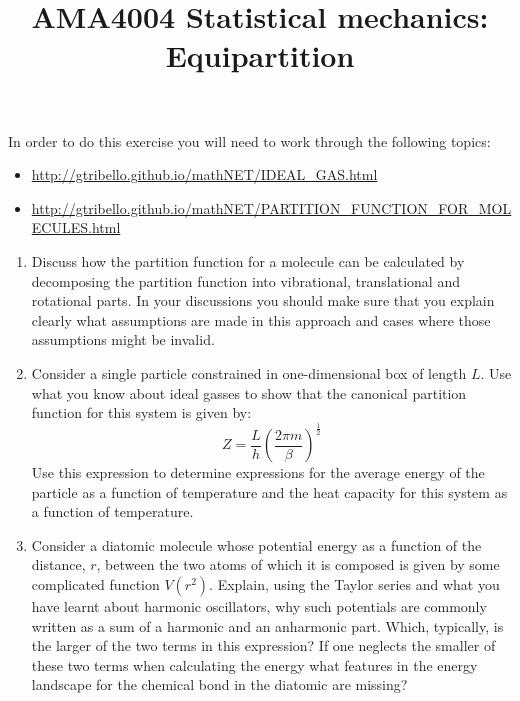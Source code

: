\documentclass[a4paper]{article}
\title{
\vspace{-3em}
\begin{tcolorbox}
\Huge\sffamily AMA4004 Statistical mechanics: Equipartition  
\end{tcolorbox}
\vspace{-3em}
}
\date{}
\begin{document}
\maketitle

In order to do this exercise you will need to work through the following topics:

\begin{itemize}
\item \href{http://gtribello.github.io/mathNET/IDEAL\_GAS.html}{http://gtribello.github.io/mathNET/IDEAL\_GAS.html}
\item \href{http://gtribello.github.io/mathNET/PARTITION\_FUNCTION\_FOR\_MOLECULES.html}{http://gtribello.github.io/mathNET/PARTITION\_FUNCTION\_FOR\_MOLECULES.html}
\end{itemize}

\begin{enumerate}

\item Discuss how the partition function for a molecule can be calculated by decomposing the partition function into vibrational, translational and rotational parts.  In your discussions you should make sure that you explain clearly what assumptions are made in this approach and cases where those assumptions might be invalid.

\item Consider a single particle constrained in one-dimensional box of length $L$.  Use what you know about ideal gasses to show that the canonical partition function for this system is given by:
$$
Z = \frac{L}{h} \left( \frac{2\pi m}{\beta} \right)^\frac{1}{2} 
$$
Use this expression to determine expressions for the average energy of the particle as a function of temperature and the heat capacity for this system as a function of temperature.

\item Consider a diatomic molecule whose potential energy as a function of the distance, $r$, between the two atoms of which it is composed is given by some complicated function $V(r^2)$.  Explain, using the Taylor series and what you have learnt about harmonic oscillators, why such potentials are commonly written as a sum of a harmonic and an anharmonic part.  Which, typically, is the larger of the two terms in this expression?  If one neglects the smaller of these two terms when calculating the energy what features in the energy landscape for the chemical bond in the diatomic are missing?


\end{enumerate}
\end{document}
